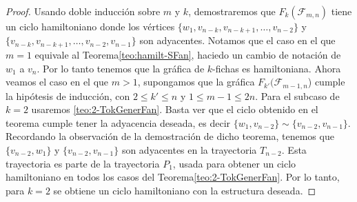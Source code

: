 \begin{proof}
    Usando doble inducci\'on sobre $m$ y $k$, demostraremos que
    $F_k(\mathcal{F}_{m,n})$ tiene un ciclo hamiltoniano donde los v\'ertices
    $\{w_1, v_{n-k}, v_{n-k+1}, \dots, v_{n-2}\}$ y $\{v_{n-k}, v_{n-k+1},
    \dots, v_{n-2}, v_{n-1}\}$ son adyacentes. Notamos que el caso en el que $m
    =1$ equivale al Teorema\ref{teo:hamilt-SFan}, haciedo un cambio de
    notaci\'on de $w_1$ a $v_n$. Por lo tanto tenemos que la gr\'afica de
    $k$-fichas es hamiltoniana. Ahora veamos el caso en el que $m>1$, supongamos
    que la gr\'afica $F_{k'}(\mathcal{F}_{m-1,n}$) cumple la hip\'otesis de
    inducci\'on, con $2\leq k'\leq n$ y $1 \leq m-1 \leq 2n$. Para el subcaso de
    $k=2$ usaremos \cref{teo:2-TokGenerFan}. Basta ver que el ciclo obtenido en
    el teorema cumple tener la adyacencia deseada, es decir $\{w_1,
    v_{n-2}\}\sim\{v_{n-2}, v_{n-1}\}$. Recordando la observaci\'on de la
    demostraci\'on de dicho teorema, tenemos que $\{v_{n-2},w_1\}$ y
    $\{v_{n-2},v_{n-1}\}$ son adyacentes en la trayectoria $T_{n-2}$. Esta
    trayectoria es parte de la trayectoria $P_1$, usada para obtener un ciclo
    hamiltoniano en todos los casos del Teorema\ref{teo:2-TokGenerFan}. Por lo
    tanto, para $k=2$ se obtiene un ciclo hamiltoniano con la estructura
    deseada.


\end{proof}
